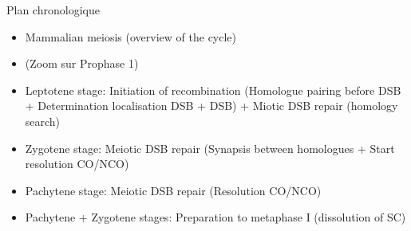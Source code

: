 
%
%



Plan chronologique
\begin{itemize}
	\item Mammalian meiosis (overview of the cycle)
	\item (Zoom sur Prophase 1)
	\item Leptotene stage: Initiation of recombination (Homologue pairing before DSB + Determination localisation DSB + DSB) + Miotic DSB repair (homology search)
	\item Zygotene stage: Meiotic DSB repair (Synapsis between homologues + Start resolution CO/NCO)
	\item Pachytene stage: Meiotic DSB repair (Resolution CO/NCO)
	\item Pachytene + Zygotene stages: Preparation to metaphase I (dissolution of SC)

\end{itemize}

